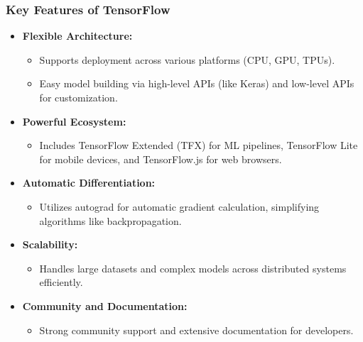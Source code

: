 \documentclass[aspectratio=169]{beamer}
\begin{document}
\begin{frame}[fragile]
    \frametitle{Key Features of TensorFlow}
    \begin{itemize}
        \item \textbf{Flexible Architecture:}
        \begin{itemize}
            \item Supports deployment across various platforms (CPU, GPU, TPUs).
            \item Easy model building via high-level APIs (like Keras) and low-level APIs for customization.
        \end{itemize}
        
        \item \textbf{Powerful Ecosystem:}
        \begin{itemize}
            \item Includes TensorFlow Extended (TFX) for ML pipelines, TensorFlow Lite for mobile devices, and TensorFlow.js for web browsers.
        \end{itemize}
        
        \item \textbf{Automatic Differentiation:}
        \begin{itemize}
            \item Utilizes autograd for automatic gradient calculation, simplifying algorithms like backpropagation.
        \end{itemize}
        
        \item \textbf{Scalability:}
        \begin{itemize}
            \item Handles large datasets and complex models across distributed systems efficiently.
        \end{itemize}

        \item \textbf{Community and Documentation:}
        \begin{itemize}
            \item Strong community support and extensive documentation for developers.
        \end{itemize}
    \end{itemize}
\end{frame}
\end{document}
